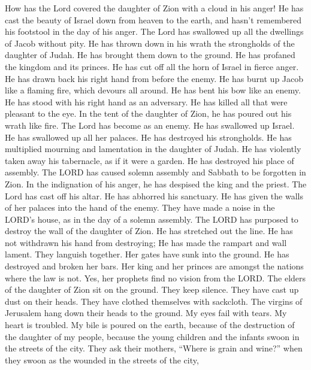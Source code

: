  How has the Lord covered the daughter of Zion with a
cloud in his anger! He has cast the beauty of Israel down from heaven to
the earth, and hasn't remembered his footstool in the day of his anger.
 The Lord has swallowed up all the dwellings of Jacob
without pity. He has thrown down in his wrath the strongholds of the
daughter of Judah. He has brought them down to the ground. He has
profaned the kingdom and its princes.  He has cut off all
the horn of Israel in fierce anger. He has drawn back his right hand
from before the enemy. He has burnt up Jacob like a flaming fire, which
devours all around.  He has bent his bow like an enemy. He
has stood with his right hand as an adversary. He has killed all that
were pleasant to the eye. In the tent of the daughter of Zion, he has
poured out his wrath like fire.  The Lord has become as an
enemy. He has swallowed up Israel. He has swallowed up all her palaces.
He has destroyed his strongholds. He has multiplied mourning and
lamentation in the daughter of Judah.  He has violently
taken away his tabernacle, as if it were a garden. He has destroyed his
place of assembly. The LORD has caused solemn assembly and Sabbath to be
forgotten in Zion. In the indignation of his anger, he has despised the
king and the priest.  The Lord has cast off his altar. He
has abhorred his sanctuary. He has given the walls of her palaces into
the hand of the enemy. They have made a noise in the LORD's house, as in
the day of a solemn assembly.  The LORD has purposed to
destroy the wall of the daughter of Zion. He has stretched out the line.
He has not withdrawn his hand from destroying; He has made the rampart
and wall lament. They languish together.  Her gates have
sunk into the ground. He has destroyed and broken her bars. Her king and
her princes are amongst the nations where the law is not. Yes, her
prophets find no vision from the LORD.  The elders of the
daughter of Zion sit on the ground. They keep silence. They have cast up
dust on their heads. They have clothed themselves with sackcloth. The
virgins of Jerusalem hang down their heads to the ground.
 My eyes fail with tears. My heart is troubled. My bile
is poured on the earth, because of the destruction of the daughter of my
people, because the young children and the infants swoon in the streets
of the city.  They ask their mothers, ``Where is grain
and wine?'' when they swoon as the wounded in the streets of the city,
